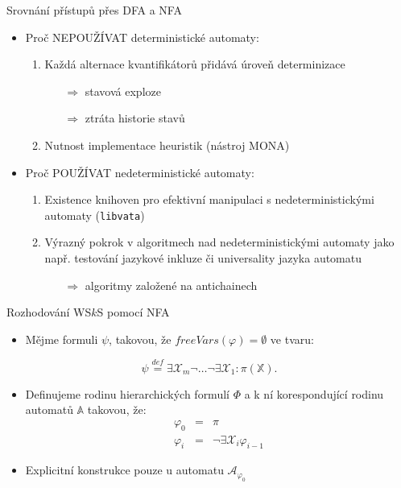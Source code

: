 \documentclass{beamer}
\begin{document}
  \begin{frame}{Srovnání přístupů přes DFA a NFA}
  \begin{itemize}
    \item Proč {\color{red} NEPOUŽÍVAT} deterministické automaty:
    \pause
    \begin{enumerate}
      \item Každá alternace kvantifikátorů přidává úroveň determinizace
      \pause
      \begin{itemize}
        \item[$\Rightarrow$]stavová exploze
      \pause
        \item[$\Rightarrow$]ztráta historie stavů
      \pause
      \end{itemize}
      \item Nutnost implementace heuristik (nástroj MONA)
      \pause
    \end{enumerate}
    \item Proč {\color{green} POUŽÍVAT} nedeterministické automaty:
    \begin{enumerate}
      \pause
      \item Existence knihoven pro efektivní manipulaci s nedeterministickými
      automaty (\texttt{libvata})
      \pause
      \item Výrazný pokrok v algoritmech nad nedeterministickými automaty jako
      např.
      testování jazykové inkluze či universality jazyka automatu
      \begin{itemize}
      \pause
        \item[$\Rightarrow$]algoritmy založené na antichainech
      \end{itemize}
    \end{enumerate}
  \end{itemize}
  \end{frame}
  
  \begin{frame}[t]{Rozhodování WS$k$S pomocí NFA}
  \begin{itemize}
  \item Mějme formuli $\psi$, takovou, že $freeVars(\varphi) = \emptyset$ ve
  tvaru:
  \end{itemize}
  \begin{equation*}
 \psi \overset{\mathit{def}}{=}
 \exists\mathcal{X}_{m}\neg\ldots\neg\exists\mathcal{X}_1: \pi(\mathbb{X}).
\end{equation*}
  \begin{itemize}
    \item Definujeme rodinu hierarchických formulí $\Phi$ a k ní korespondující
    rodinu automatů $\mathbb{A}$ takovou, že:
    \begin{eqnarray}
     \varphi_0 & = & \pi\\
     \varphi_i & = & \neg\exists\mathcal{X}_i\varphi_{i-1}
    \end{eqnarray}
    \item Explicitní konstrukce pouze u automatu $\mathcal{A}_{\varphi_0}$
  \end{itemize}
  
  \end{frame}
  
\end{document}
